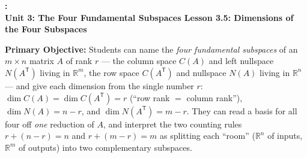 \documentclass[10pt]{article}
\newcommand{\T}{\mathsf{T}}
\newcommand{\UnitNumberName}{Unit 3: The Four Fundamental Subspaces \quad}
\newcommand{\LessonNumberName}{Lesson 3.5: Dimensions of the Four Subspaces}
\begin{document}
\begin{center}
    {\Large\bfseries \CourseName: \SchoolYear \\
    {\small\bfseries \UnitNumberName \LessonNumberName}}
\end{center}

\begin{tcolorbox}[colback=blush, colframe=burgundy, boxrule=0.9pt, arc=2mm,
    left=2mm, right=2mm, top=1.5mm, bottom=1.5mm]
    \textbf{Primary Objective:} Students can name the \emph{four fundamental subspaces} of an $m\times n$
    matrix $A$ of rank $r$ --- the column space $C(A)$ and left nullspace $N(A^{\T})$ living in
    $\mathbb{R}^m$, the row space $C(A^{\T})$ and nullspace $N(A)$ living in $\mathbb{R}^n$ --- and give
    each dimension from the single number $r$: $\dim C(A)=\dim C(A^{\T})=r$ (``row rank $=$ column rank''),
    $\dim N(A)=n-r$, and $\dim N(A^{\T})=m-r$. They can read a basis for all four off \emph{one} reduction
    of $A$, and interpret the two counting rules $r+(n-r)=n$ and $r+(m-r)=m$ as splitting each ``room''
    ($\mathbb{R}^n$ of inputs, $\mathbb{R}^m$ of outputs) into two complementary subspaces.
\end{tcolorbox}
\end{document}
